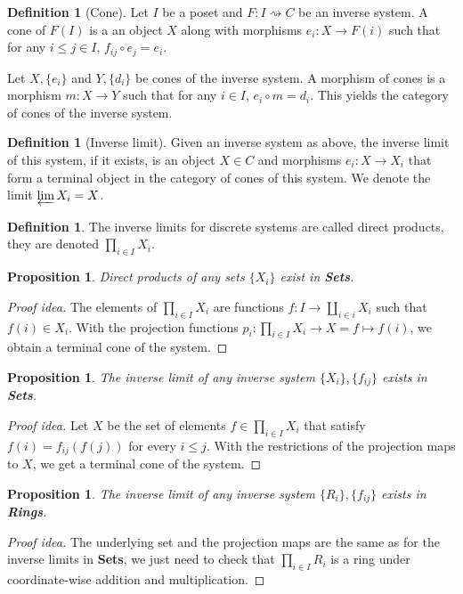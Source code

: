 \documentclass[paper=a4, fontsize=12pt]{scrartcl} %
\newtheorem{prop}[thm]{Proposition}
\theoremstyle{definition}
\newtheorem{defn}[thm]{Definition}
\theoremstyle{remark}
\begin{document}
\begin{defn}[Cone]
	Let $I$ be a poset and $F:I\rightsquigarrow C$ be an inverse system. A cone of $F(I)$ is a an object $X$ along with morphisms $e_i: X\rightarrow F(i)$ such that for any $i\leq j \in I$, $f_{ij}\circ e_j = e_i$.
	
	Let $X, \{e_i\}$ and $Y, \{d_i\}$ be cones of the inverse system. A morphism of cones is a morphism $m : X \rightarrow Y$ such that for any $i \in I$, $e_i\circ m = d_i$. This yields the category of cones of the inverse system.
\end{defn}
\begin{defn}[Inverse limit]
	Given an inverse system as above, the inverse limit of this system, if it exists, is an object $X \in C$ and morphisms $e_i: X \rightarrow X_i$ that form a terminal object in the category of cones of this system. We denote the limit $\varprojlim X_i = X$.
\end{defn}
\begin{defn}
	The inverse limits for discrete systems are called direct products, they are denoted $\prod_{i \in I} X_i$.
\end{defn}
\begin{prop}
	Direct products of any sets $\{X_i\}$ exist in \textbf{Sets}.
\end{prop}
\begin{proof}[Proof idea]
	The elements of $\prod_{i \in I} X_i$ are functions $f: I  \rightarrow \amalg_{i \in i} X_i$ such that $f(i) \in X_i$. With the projection functions $p_i : \prod_{i \in I} X_i \rightarrow X = f \mapsto f(i)$, we obtain a terminal cone of the system.
\end{proof}
\begin{prop}
	The inverse limit of any inverse system $\{X_i\}, \{f_{ij}\}$ exists in \textbf{Sets}.
\end{prop}
\begin{proof}[Proof idea]
	Let $X$ be the set of elements $f \in \prod_{i \in I}X_i$ that satisfy $f(i) = f_{ij}(f(j))$ for every $i\leq j$. With the restrictions of the projection maps to $X$, we get a terminal cone of the system.
\end{proof}
\begin{prop}
	The inverse limit of any inverse system $\{R_i\}, \{f_{ij}\}$ exists in \textbf{Rings}.
\end{prop}
\begin{proof}[Proof idea]
	The underlying set and the projection maps are the same as for the inverse limits in \textbf{Sets}, we just need to check that $\prod_{i \in I} R_i$ is a ring under coordinate-wise addition and multiplication.
\end{proof}
\end{document}
